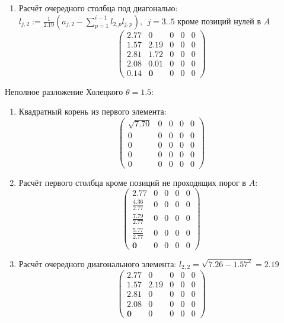 \begin{multicols}{3}
\begin{enumerate}
    \item Расчёт очередного столбца под диагональю:$l_{j,2} := \frac{1}{2.19}(a_{j,2} - \sum_{p=1}^{i-1}l_{2,p}l_{j,p}),~~j=3..5$ кроме позиций нулей в $A$
    $$\begin{pmatrix}
        2.77 & 0          & 0 & 0 & 0 \\
        1.57 & 2.19       & 0 & 0 & 0 \\
        2.81 & 1.72       & 0 & 0 & 0 \\
        2.08 & 0.01       & 0 & 0 & 0 \\
        0.14 & \mathbf{0} & 0 & 0 & 0
    \end{pmatrix}$$
\end{enumerate}

\columnbreak
Неполное разложение Холецкого $\theta=1.5$:
\begin{enumerate}
    \item Квадратный корень из первого элемента:
    $$\begin{pmatrix}
        \sqrt{7.70} & 0 & 0 & 0 & 0 \\
        0           & 0 & 0 & 0 & 0 \\
        0           & 0 & 0 & 0 & 0 \\
        0           & 0 & 0 & 0 & 0 \\
        0           & 0 & 0 & 0 & 0
    \end{pmatrix}$$

    \item Расчёт первого столбца кроме позиций не проходящих порог в $A$:
    $$\begin{pmatrix}
        2.77              & 0 & 0 & 0 & 0 \\
        \frac{4.36}{2.77} & 0 & 0 & 0 & 0 \\
        \frac{7.79}{2.77} & 0 & 0 & 0 & 0 \\
        \frac{5.77}{2.77} & 0 & 0 & 0 & 0 \\
        \mathbf{0}        & 0 & 0 & 0 & 0
    \end{pmatrix}$$

    \item Расчёт очередного диагонального элемента: $l_{2,2} = \sqrt{7.26 - 1.57^2} = 2.19$
    $$\begin{pmatrix}
        2.77 & 0    & 0 & 0 & 0 \\
        1.57 & 2.19 & 0 & 0 & 0 \\
        2.81 & 0    & 0 & 0 & 0 \\
        2.08 & 0    & 0 & 0 & 0 \\
         \mathbf{0}    & 0    & 0 & 0 & 0
    \end{pmatrix}$$


\end{enumerate}
\end{multicols}
